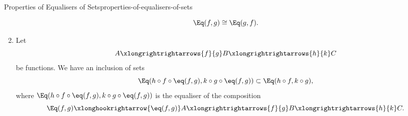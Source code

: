 \begin{proposition}{Properties of Equalisers of Sets}{properties-of-equalisers-of-sets}
\begin{enumerate}
            \[
                \Eq(f,g)
                \cong
                \Eq(g,f).
            \]%
        \item\label{properties-of-equalisers-of-sets-interaction-with-composition}Let
            \[
                A
                \xlongrightrightarrows{f}{g}
                B
                \xlongrightrightarrows{h}{k}
                C
            \]%
            be functions. We have an inclusion of sets
            \[
                \Eq(h\circ f\circ\eq(f,g),k\circ g\circ\eq(f,g))
                \subset
                \Eq(h\circ f,k\circ g),
            \]%
            where $\Eq(h\circ f\circ\eq(f,g),k\circ g\circ\eq(f,g))$ is the equaliser of the composition
            \[
                \Eq(f,g)%
                \xlonghookrightarrow{\eq(f,g)}%
                A%
                \xlongrightrightarrows{f}{g}%
                B%
                \xlongrightrightarrows{h}{k}%
                C.%
            \]%
    \end{enumerate}
\end{proposition}
